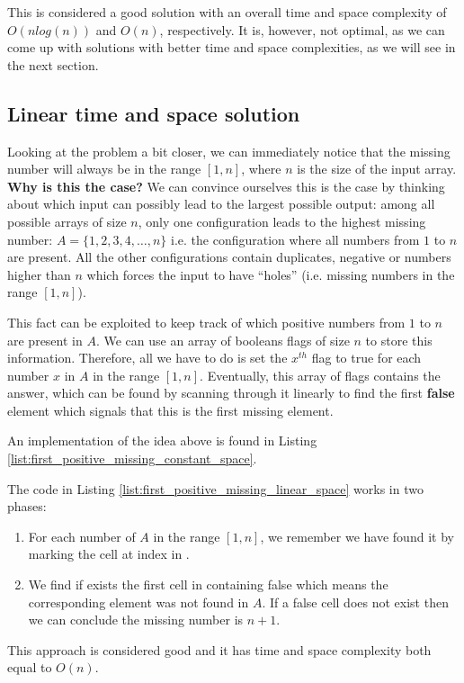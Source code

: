 This is considered a good solution with an overall time and space complexity of $O(nlog(n))$ and $O(n)$, respectively. It is, however, not optimal, as we can come up with solutions with better time and space complexities, as we will see in the next section. 


\subsection{Linear time and space solution}
\label{first_positive_missing:sec:linear_space}

Looking at the problem a bit closer, we can immediately notice that the missing number will always be
in the range $[1,n]$, where $n$ is the size of the input array. \textbf{Why is this the case?}
We can convince ourselves this is the case by thinking about which input can possibly lead to the largest possible output: among
all possible arrays of size $n$, only one configuration leads to the highest missing number: $A =
\{1,2,3,4, \ldots ,n\}$ i.e. the configuration where all numbers from $1$ to $n$ are present. All the other configurations contain duplicates,
negative or numbers higher than $n$ which forces the input to have ``holes'' (i.e. missing numbers in the range $[1,n]$). 

This fact can be exploited to keep track of which positive numbers from
$1$ to $n$ are present in $A$. We can use an array of booleans flags of size $n$ to store this information. Therefore, all we have to do is set the $x^{th}$ flag to true for each number  $x$ in $A$ in the range $[1,n]$.
Eventually, this array of flags contains the answer, which can be found by scanning through it linearly to find the first \textbf{false} element which signals that this is the first missing element.

An implementation of the idea above is found in Listing \ref{list:first_positive_missing_constant_space}.




The code in Listing \ref{list:first_positive_missing_linear_space} works in two phases:
\begin{enumerate}
	\item For each number  of $A$ in the range $[1,n]$, we remember we have found it by marking the cell at index  in .
	\item We find if exists the first cell in  containing false which means the corresponding element was not found in $A$. If a false cell does not exist then we can conclude the missing number is $n+1$.
\end{enumerate}
This approach is considered good and it has time and space complexity both equal to $O(n)$.


